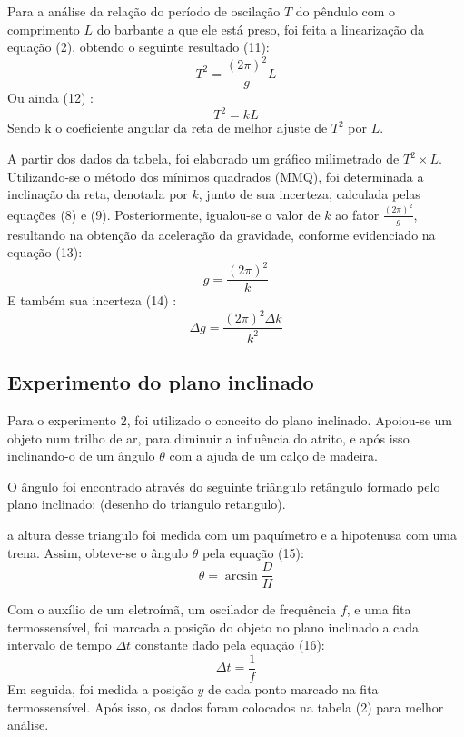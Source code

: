 \documentclass[12pt, letterpaper]{article}
\begin{document}
    
    Para a análise da relação do período de oscilação $T$ do pêndulo com o comprimento $L$ do barbante a que ele está preso, foi feita a linearização da equação (2), obtendo o seguinte resultado (11):
    \begin{equation}
    T^2 = \frac{(2\pi)^2}{g}L 
    \end{equation}
    Ou ainda (12) :
    \begin{equation}
    T^2 = kL
    \end{equation}
    Sendo k o coeficiente angular da reta de melhor ajuste de $T^2$ por $L$.

    
   A partir dos dados da tabela, foi elaborado um gráfico milimetrado de $T^2 \times L$. Utilizando-se o método dos mínimos quadrados (MMQ), foi determinada a inclinação da reta, denotada por $k$, junto de sua incerteza, calculada pelas equações (8) e (9). Posteriormente, igualou-se o valor de $k$ ao fator $\frac{(2\pi)^2}{g}$, resultando na obtenção da aceleração da gravidade, conforme evidenciado na equação (13):
    \begin{equation}
     g = \frac{(2\pi)^2}{k}
    \end{equation}
    E também sua incerteza (14) :
    \begin{equation}
    \Delta g = \frac{(2\pi)^2\Delta k}{k^2}
    \end{equation}
    \subsection{Experimento do plano inclinado}
    Para o experimento 2, foi utilizado o conceito do plano inclinado. Apoiou-se um objeto num trilho de ar, para diminuir a influência do atrito, e após isso inclinando-o de um ângulo $\theta$ com a ajuda de um calço de madeira. 
    
    O ângulo foi encontrado através do seguinte triângulo retângulo formado pelo plano inclinado:
    (desenho do triangulo retangulo).

    
    a altura desse triangulo foi medida com um paquímetro e a hipotenusa com uma trena. Assim, obteve-se o ângulo $\theta$ pela equação (15):
    \begin{equation}
        \theta = \arcsin{\frac{D}{H}}
    \end{equation}
    
    Com o auxílio de um eletroímã, um oscilador de frequência $f$, e uma fita termossensível, foi marcada a posição do objeto no plano inclinado a cada intervalo de tempo $\Delta t$ constante dado pela equação (16): 
    \begin{equation}
        \Delta t = \frac{1}{f}
    \end{equation}
    Em seguida, foi medida a posição $y$ de cada ponto marcado na fita termossensível. Após isso, os dados foram colocados na tabela (2) para melhor análise.
\end{document}
